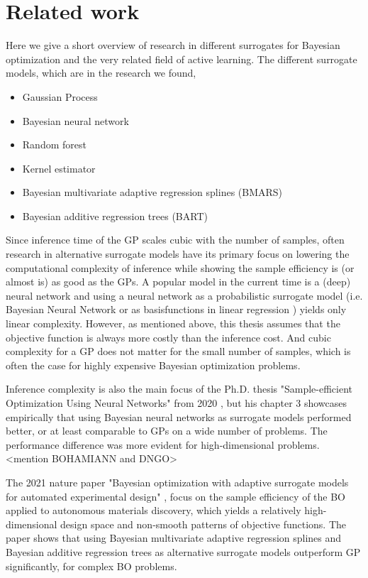 \section{Related work}
Here we give a short overview of research in different surrogates for Bayesian optimization
and the very related field of active learning. The different surrogate models, which are in the 
research we found, 
\begin{itemize}[noitemsep]
    \item Gaussian Process
    \item Bayesian neural network
    \item Random forest
    \item Kernel estimator
    \item Bayesian multivariate adaptive regression splines (BMARS)
    \item Bayesian additive regression trees (BART)
\end{itemize}

Since inference time of the GP scales cubic with the number of samples, often research in
alternative surrogate models have its primary focus on lowering the computational complexity of
inference while showing the sample efficiency is (or almost is) as good as the GPs. A popular model
in the current time is a (deep) neural network and using a neural network as a probabilistic
surrogate model (i.e. Bayesian Neural Network \cite{BOHAMIANN} or as basisfunctions in linear
regression \cite{DNGO}) yields only linear complexity. However, as mentioned above, this thesis
assumes that the objective function is always more costly than the inference cost. And cubic
complexity for a GP does not matter for the small number of samples, which is often the case for
highly expensive Bayesian optimization problems. 

Inference complexity is also the main focus of the Ph.D. thesis "Sample-efficient Optimization Using
Neural Networks" from 2020 \cite{PhDthesis}, but his chapter 3 showcases empirically that using Bayesian
neural networks as surrogate models performed better, or at least comparable to GPs on a wide number
of problems. The performance difference was more evident for high-dimensional problems. <mention
BOHAMIANN and DNGO>

The 2021 nature paper "Bayesian optimization with adaptive surrogate models for automated experimental design"
\cite{Nature_BO_paper}, focus on the sample efficiency of the BO applied to autonomous materials discovery, 
which yields a relatively high-dimensional design space and non-smooth patterns of objective functions.  
The paper shows that using Bayesian multivariate adaptive regression splines
and Bayesian additive regression trees as alternative surrogate models outperform GP significantly, 
for complex BO problems. 

